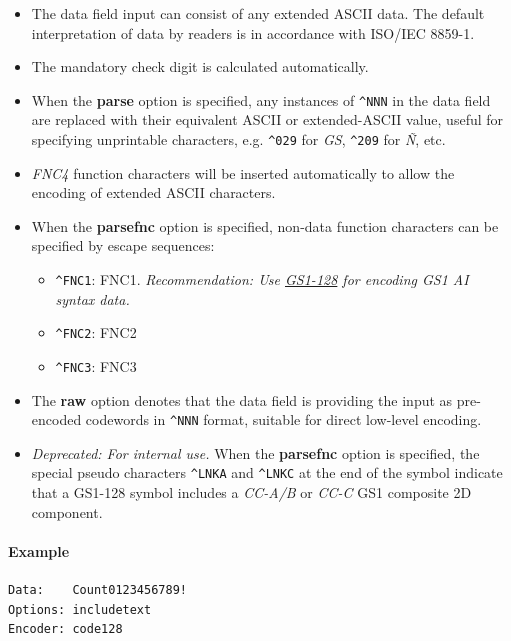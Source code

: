 \begin{itemize}
\tightlist
\item
  The data field input can consist of any extended ASCII data. The
  default interpretation of data by readers is in accordance with
  ISO/IEC 8859-1.
\item
  The mandatory check digit is calculated automatically.
\item
  When the \textbf{parse} option is specified, any instances of
  \texttt{\^{}NNN} in the data field are replaced with their equivalent
  ASCII or extended-ASCII value, useful for specifying unprintable
  characters, e.g. \texttt{\^{}029} for \emph{GS}, \texttt{\^{}209} for
  \emph{Ñ}, etc.
\item
  \emph{FNC4} function characters will be inserted automatically to
  allow the encoding of extended ASCII characters.
\item
  When the \textbf{parsefnc} option is specified, non-data function
  characters can be specified by escape sequences:

  \begin{itemize}
  \tightlist
  \item
    \texttt{\^{}FNC1}: FNC1. \emph{Recommendation: Use
    \protect\hyperlink{gs1-128}{GS1-128} for encoding GS1 AI syntax
    data.}
  \item
    \texttt{\^{}FNC2}: FNC2
  \item
    \texttt{\^{}FNC3}: FNC3
  \end{itemize}
\item
  The \textbf{raw} option denotes that the data field is providing the
  input as pre-encoded codewords in \texttt{\^{}NNN} format, suitable
  for direct low-level encoding.
\item
  \emph{Deprecated: For internal use.} When the \textbf{parsefnc} option
  is specified, the special pseudo characters \texttt{\^{}LNKA} and
  \texttt{\^{}LNKC} at the end of the symbol indicate that a GS1-128
  symbol includes a \emph{CC-A/B} or \emph{CC-C} GS1 composite 2D
  component.
\end{itemize}

\hypertarget{example-2}{%
\paragraph{Example}\label{example-2}}

\begin{verbatim}
Data:    Count0123456789!
Options: includetext
Encoder: code128
\end{verbatim}

